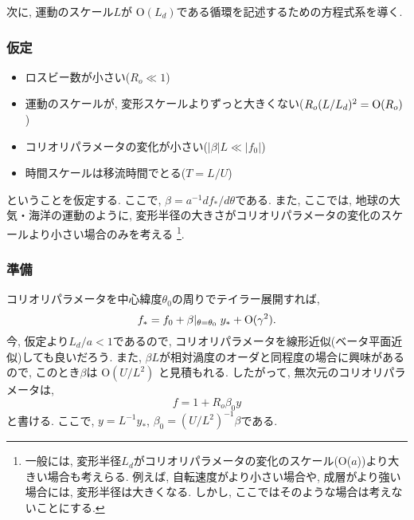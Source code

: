 次に, 運動のスケール$L$が O$(L_d)$である循環を記述するための方程式系を導く. 

\subsubsection*{仮定}
\begin{itemize}
 \item ロスビー数が小さい($R_o \ll 1$)
 \item 運動のスケールが, 変形スケールよりずっと大きくない($R_o (L/L_d)^2 = {\rm O}(R_o)$)
 \item コリオリパラメータの変化が小さい($|\beta|L \ll |f_0|$)
 \item 時間スケールは移流時間でとる($T=L/U$)
\end{itemize}
ということを仮定する. 
ここで, $\beta=a^{-1} df_*/d\theta$である. 
また, ここでは, 地球の大気・海洋の運動のように, 
変形半径の大きさがコリオリパラメータの変化のスケールより小さい場合のみを考える%
\footnote{
一般には, 変形半径$L_d$がコリオリパラメータの変化のスケール(O($a$))より大きい場合も考えらる. 
例えば, 自転速度がより小さい場合や, 成層がより強い場合には, 変形半径は大きくなる.  
しかし, ここではそのような場合は考えないことにする. 
}.  

\subsubsection*{準備}
コリオリパラメータを中心緯度$\theta_0$の周りでテイラー展開すれば, 
\begin{equation}
  f_* = f_0 + \beta|_{\theta=\theta_0} \; y_* + {\rm O(\gamma^2)}. 
\end{equation}
今, 仮定より$L_d/a < 1$であるので, 
コリオリパラメータを線形近似(ベータ平面近似)しても良いだろう. 
また, $\beta L$が相対渦度のオーダと同程度の場合に興味があるので, 
このとき$\beta$は O$(U/L^2)$ と見積もれる. 
したがって, 無次元のコリオリパラメータは, 
\begin{equation}
  f = 1 + R_o \beta_0 y 
\label{eq:f_beta_plane_nondim}
\end{equation}
と書ける. 
ここで, $y=L^{-1}y_*$, $\beta_0=(U/L^2)^{-1}\beta$である. 

